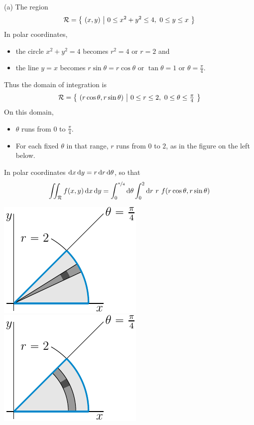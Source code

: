 \begin{solution}
(a) The region 
\begin{equation*}
\mathcal{R}=\big\{ \ (x,y)\ \big|\ 0\le x^2+y^2\le 4,\ 0\le y\le x\ \big\}
\end{equation*}
In polar coordinates, 
\begin{itemize}
\item
the circle $x^2+y^2=4$ becomes $r^2=4$ or $r=2$ and 
\item
the line $y=x$ becomes $r\sin\theta=r\cos\theta$ or $\tan\theta=1$ 
or $\theta=\frac{\pi}{4}$. 
\end{itemize}
Thus the domain of integration is
\begin{equation*}
\cR=\Set{(r\cos\theta,r\sin\theta)}{0\le r\le 2,\ 0\le\theta\le\tfrac{\pi}{4}}
\end{equation*}
On this domain,
\begin{itemize}
\item 
$\theta$ runs from $0$ to $\frac{\pi}{4}$. 
\item
For each fixed $\theta$ in that range, $r$ runs from $0$ to $2$, 
as in the figure on the left below.
\end{itemize}
In polar coordinates $\mathrm{d}x\,\mathrm{d}y = r\,\mathrm{d}r\,\mathrm{d}\theta$, so that
\begin{equation*}
\iint_{\mathcal{R}} f(x,y)\,\mathrm{d}x\,\mathrm{d}y
=\int_0^{\nicefrac{\pi}{4}}\mathrm{d}\theta
 \int_0^2\mathrm{d}r\ r\ f(r\cos\theta,r\sin\theta)
\end{equation*}
\begin{center}
     \includegraphics{fig/polar5a2.pdf}\qquad\qquad
     \includegraphics{fig/polar5a3.pdf}

\end{center}
\end{solution}
